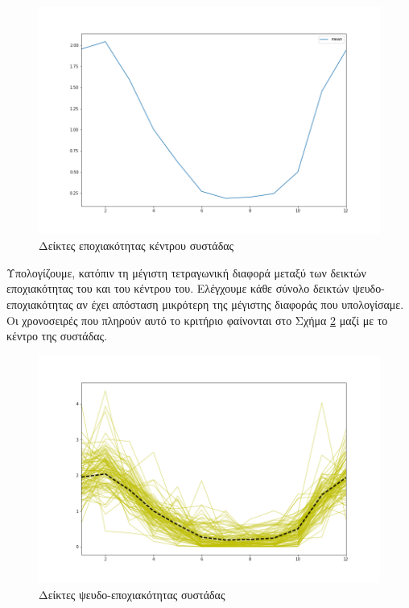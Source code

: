 \begin{figure}[t!]
  \includegraphics[scale=0.5]{figures/centroid.png}
\centering
\caption{Δείκτες εποχιακότητας κέντρου συστάδας}
\label{centroid}
\end{figure} 

Υπολογίζουμε, κατόπιν τη μέγιστη τετραγωνική διαφορά μεταξύ των δεικτών εποχιακότητας του  και του κέντρου του. Ελέγχουμε κάθε σύνολο δεικτών ψευδο-εποχιακότητας αν έχει απόσταση μικρότερη της μέγιστης διαφοράς που υπολογίσαμε. Οι χρονοσειρές που πληρούν αυτό το κριτήριο φαίνονται στο Σχήμα \ref{pseudocentroid} μαζί με το κέντρο της συστάδας.

\begin{figure}[t!]
  \includegraphics[scale=0.5]{figures/pseudocentroid.png}
\centering
\caption{Δείκτες ψευδο-εποχιακότητας συστάδας}
\label{pseudocentroid}
\end{figure} 


